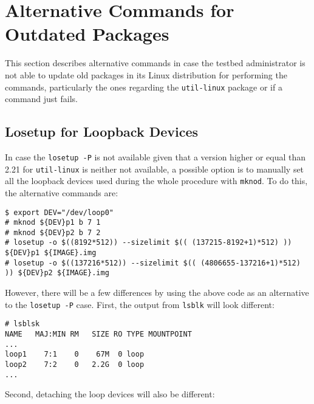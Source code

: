 

% 

\section{Alternative Commands for Outdated Packages}
This section describes alternative commands in case the testbed administrator
is not able to update old packages in its Linux distribution for performing
the commands, particularly the ones regarding the \texttt{util-linux} package
or if a command just fails.

\subsection{Losetup for Loopback Devices}
\label{sec:alternative_losetup}

In case the \texttt{losetup -P} is not available given that a version
higher or equal than 2.21 for \texttt{util-linux} is neither not available,
a possible option is to manually set all the loopback devices used during the
whole procedure with \texttt{mknod}. To do this, the alternative commands are:

\begin{lstlisting}[]
$ export DEV="/dev/loop0"
# mknod ${DEV}p1 b 7 1
# mknod ${DEV}p2 b 7 2
# losetup -o $((8192*512)) --sizelimit $(( (137215-8192+1)*512) )) ${DEV}p1 ${IMAGE}.img
# losetup -o $((137216*512)) --sizelimit $(( (4806655-137216+1)*512) )) ${DEV}p2 ${IMAGE}.img
\end{lstlisting}
\FloatBarrier
\vspace{-5mm}

However, there will be a few differences by using the above code as an
alternative to the \texttt{losetup -P} case. First, the output from
\texttt{lsblk} will look different:

\begin{lstlisting}[]
# lsblsk
NAME   MAJ:MIN RM   SIZE RO TYPE MOUNTPOINT
...
loop1    7:1    0    67M  0 loop
loop2    7:2    0   2.2G  0 loop
...
\end{lstlisting}
\FloatBarrier
\vspace{-5mm}

Second, detaching the loop devices will also be different:

